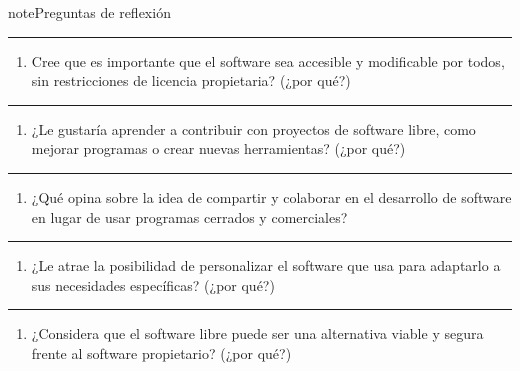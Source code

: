 \documentclass[letterpaper,10pt,spanish]{sphinxmanual}
\begin{document}
\begin{sphinxadmonition}{note}{Preguntas de reflexión}
\bigskip\hrule\bigskip

\begin{enumerate}
%
\setcounter{enumi}{5}
\item {} 
\sphinxAtStartPar
Cree que es importante que el software sea accesible y modificable por todos, sin restricciones de licencia propietaria? (¿por qué?)

\end{enumerate}


\bigskip\hrule\bigskip

\begin{enumerate}
%
\setcounter{enumi}{6}
\item {} 
\sphinxAtStartPar
¿Le gustaría aprender a contribuir con proyectos de software libre, como mejorar programas o crear nuevas herramientas? (¿por qué?)

\end{enumerate}


\bigskip\hrule\bigskip

\begin{enumerate}
%
\setcounter{enumi}{7}
\item {} 
\sphinxAtStartPar
¿Qué opina sobre la idea de compartir y colaborar en el desarrollo de software en lugar de usar programas cerrados y comerciales?

\end{enumerate}


\bigskip\hrule\bigskip

\begin{enumerate}
%
\setcounter{enumi}{8}
\item {} 
\sphinxAtStartPar
¿Le atrae la posibilidad de personalizar el software que usa para adaptarlo a sus necesidades específicas? (¿por qué?)

\end{enumerate}


\bigskip\hrule\bigskip

\begin{enumerate}
%
\setcounter{enumi}{9}
\item {} 
\sphinxAtStartPar
¿Considera que el software libre puede ser una alternativa viable y segura frente al software propietario? (¿por qué?)

\end{enumerate}
\end{sphinxadmonition}
\end{document}
